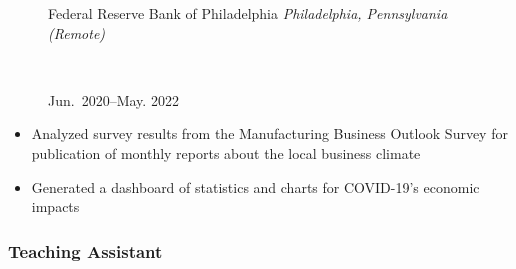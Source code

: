 \documentclass[
  letterpaper,
  DIV=11,
  numbers=noendperiod]{scrartcl}
\providecommand{\tightlist}{%
  \setlength{\itemsep}{0pt}\setlength{\parskip}{0pt}}\usepackage{longtable,booktabs,array}
\begin{document}
\begin{figure}

\begin{minipage}[t]{0.49\linewidth}

{\centering 

\RaggedRight Federal Reserve Bank of Philadelphia \newline
\emph{Philadelphia, Pennsylvania (Remote)}

}

\end{minipage}%
%
\begin{minipage}[t]{0.02\linewidth}

{\centering 

~

}

\end{minipage}%
%
\begin{minipage}[t]{0.49\linewidth}

{\centering 

\RaggedLeft Jun.~2020--May. 2022

}

\end{minipage}%

\end{figure}

\begin{itemize}
\tightlist
\item
  Analyzed survey results from the Manufacturing Business Outlook Survey
  for publication of monthly reports about the local business climate
\item
  Generated a dashboard of statistics and charts for COVID-19's economic
  impacts
\end{itemize}

\hypertarget{teaching-assistant-1}{%
\subsubsection{Teaching Assistant}\label{teaching-assistant-1}}
\end{document}
